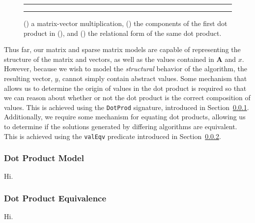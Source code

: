 \documentclass[sigconf]{acmart}
\begin{document}
\begin{figure}
\begin{subfigure}[b]{0.5\textwidth}
  \centering
  
  \caption{}
  \label{fig:mvm}
\end{subfigure}
{\color{lightgray}\rule{0.4\textwidth}{0.1pt}}
\par\bigskip
\begin{subfigure}[b]{0.5\textwidth}
  \centering
  
  \caption{}
  \label{fig:dp}
\end{subfigure}
{\color{lightgray}\rule{0.4\textwidth}{0.1pt}}
\par\bigskip
\begin{subfigure}[b]{0.5\textwidth}
  \centering
  
  \caption{}
  \label{fig:dpt}
\end{subfigure}
\caption{() a matrix-vector multiplication, () the components of the first dot product in (), and () the relational form of the same dot product.}
\end{figure}

Thus far, our matrix and sparse matrix models are capable of representing the structure of the matrix and vectors, as well as the values contained in $\bm{A}$ and $x$.  However, because we wish to model the \emph{structural} behavior of the algorithm, the resulting vector, $y$, cannot simply contain abstract values.  Some mechanism that allows us to determine the origin of values in the dot product is required so that we can reason about whether or not the dot product is the correct composition of values.  This is achieved using the \texttt{DotProd} signature, introduced in Section~\ref{sec:dotprod}.  Additionally, we require some mechanism for equating dot products, allowing us to determine if the solutions generated by differing algorithms are equivalent.  This is achieved using the \texttt{valEqv} predicate introduced in Section~\ref{sec:valeqv}.

\subsubsection{Dot Product Model}
\label{sec:dotprod}

Hi.
\begin{figure}

\end{figure}

\subsubsection{Dot Product Equivalence}
\label{sec:valeqv}

Hi.


\end{document}
